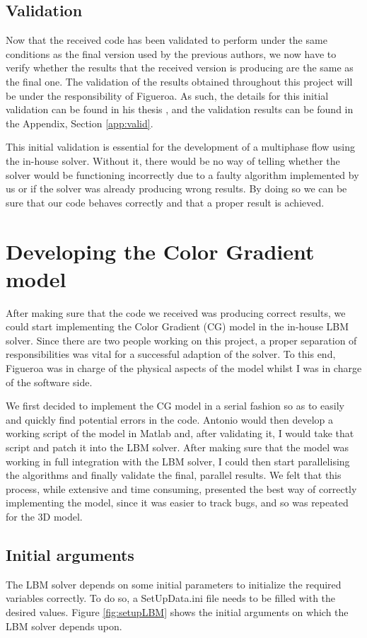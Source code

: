 \documentclass[12pt, openany]{book}
\begin{document}
\subsection{Validation}
Now that the received code has been validated to perform under the same conditions as the final version used by the previous authors, we now have to verify whether the results that the received version is producing are the same as the final one. The validation of the results obtained throughout this project will be under the responsibility of Figueroa. As such, the details for this initial validation can be found in his thesis \cite{antonioThesis}, and the validation results can be found in the Appendix, Section \ref{app:valid}.
\par This initial validation is essential for the development of a multiphase flow using the in-house solver. Without it, there would be no way of telling whether the solver would be functioning incorrectly due to a faulty algorithm implemented by us or if the solver was already producing wrong results. By doing so we can be sure that our code behaves correctly and that a proper result is achieved.

\section{Developing the Color Gradient model}
After making sure that the code we received was producing correct results, we could start implementing the Color Gradient (CG) model in the in-house LBM solver. Since there are two people working on this project, a proper separation of responsibilities  was vital for a successful adaption of the solver. To this end, Figueroa \cite{antonioThesis} was in charge of the physical aspects of the model whilst I was in charge of the software side. \par
We first decided to implement the CG model in a serial fashion so as to easily and quickly find potential errors in the code. Antonio would then develop a working script of the model in Matlab and, after validating it, I would take that script and patch it into the LBM solver. After making sure that the model was working in full integration with the LBM solver, I could then start parallelising the algorithms and finally validate the final, parallel results. We felt that this process, while extensive and time consuming, presented the best way of correctly implementing the model, since it was easier to track bugs, and so was repeated for the 3D model.
\subsection{Initial arguments}
The LBM solver depends on some initial parameters to initialize the required variables correctly. To do so, a SetUpData.ini file needs to be filled with the desired values. Figure \ref{fig:setupLBM} shows the initial arguments on which the LBM solver depends upon.
\end{document}
